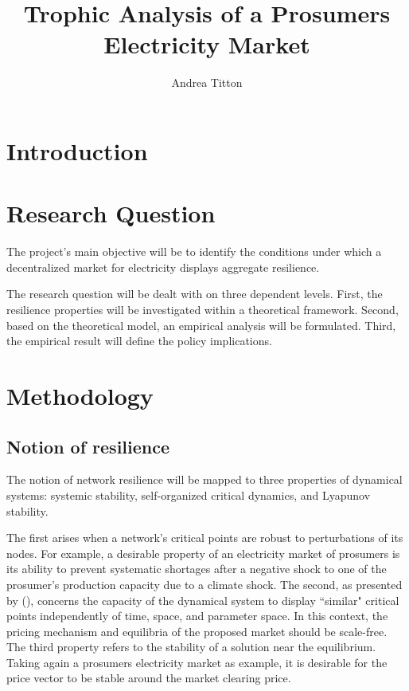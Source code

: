 \documentclass[american]{scrartcl}
\title{
        Trophic Analysis of a Prosumers Electricity Market
    }
\author{Andrea Titton}
\begin{document}
\nocite{*}
\maketitle

\section{Introduction}

\section{Research Question}

The project's main objective will be to identify the conditions under which a decentralized market for electricity displays aggregate resilience.

The research question will be dealt with on three dependent levels. First, the resilience properties will be investigated within a theoretical framework. Second, based on the theoretical model, an empirical analysis will be formulated. Third, the empirical result will define the policy implications.

\section{Methodology}

\subsection{Notion of resilience}

The notion of network resilience will be mapped to three properties of dynamical systems: systemic stability, self-organized critical dynamics, and Lyapunov stability.

The first arises when a network's critical points are robust to perturbations of its nodes. For example, a desirable property of an electricity market of prosumers is its ability to prevent systematic shortages after a negative shock to one of the prosumer's production capacity due to a climate shock. The second, as presented by \citeauthor{Bak1995} (\citeyear{Bak1995}), concerns the capacity of the dynamical system to display ``similar" critical points independently of time, space, and parameter space. In this context, the pricing mechanism and equilibria of the proposed market should be scale-free. The third property refers to the stability of a solution near the equilibrium. Taking again a prosumers electricity market as example, it is desirable for the price vector to be stable around the market clearing price.
\end{document}
